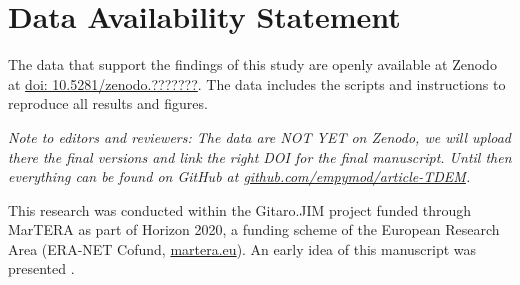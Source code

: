 \documentclass[extra, camera,%
    final,       %
]{gji}
\begin{document}
\section{Data Availability Statement} %

The data that support the findings of this study are openly available at Zenodo
at \href{https://zenodo.org/badge/DOI/10.5281/zenodo.???????}{doi:
10.5281/zenodo.???????}. The data includes the scripts and instructions to
reproduce all results and figures.

\emph{Note to editors and reviewers: The data are NOT YET on Zenodo, we will
  upload there the final versions and link the right DOI for the final
  manuscript. Until then everything can be found on GitHub at
  \href{https://github.com/empymod/article-TDEM}%
  {github.com/empymod/article-TDEM}.}


\begin{acknowledgments} %
This research was conducted within the Gitaro.JIM project funded through
MarTERA as part of Horizon 2020, a funding scheme of the European Research Area
(ERA-NET Cofund, \href{https://www.martera.eu}{martera.eu}).
An early idea of this manuscript was presented 
\cite{EAGE.20.Werthmuller}.
\end{acknowledgments}





\label{lastpage}
\end{document}
